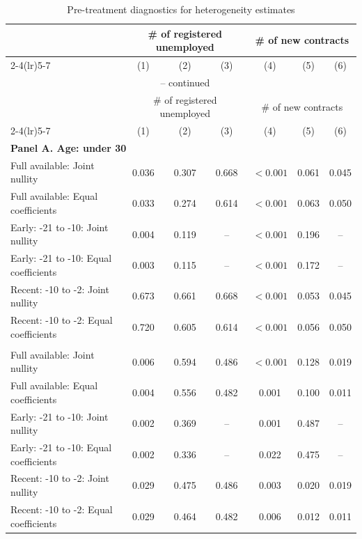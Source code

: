 \begingroup
\scriptsize
\renewcommand{\arraystretch}{0.88}
\setlength{\tabcolsep}{2.0pt}
\begin{longtable}{@{}lcccccc@{}}
\caption{Pre-treatment diagnostics for heterogeneity estimates}\label{tab:v1_heterogeneity_pretrends}\\
\toprule
& \multicolumn{3}{c}{\# of registered unemployed} & \multicolumn{3}{c}{\# of new contracts} \\
\cmidrule(lr){2-4}\cmidrule(lr){5-7}
& (1) & (2) & (3) & (4) & (5) & (6) \\
\midrule
\endfirsthead
\multicolumn{7}{c}{\tablename\ \thetable{} -- continued} \\
\toprule
& \multicolumn{3}{c}{\# of registered unemployed} & \multicolumn{3}{c}{\# of new contracts} \\
\cmidrule(lr){2-4}\cmidrule(lr){5-7}
& (1) & (2) & (3) & (4) & (5) & (6) \\
\midrule
\endhead
\multicolumn{7}{l}{\textbf{Panel A. Age: under 30}} \\
Full available: Joint nullity & 0.036 & 0.307 & 0.668 & $<0.001$ & 0.061 & 0.045 \\
Full available: Equal coefficients & 0.033 & 0.274 & 0.614 & $<0.001$ & 0.063 & 0.050 \\
Early: -21 to -10: Joint nullity & 0.004 & 0.119 & -- & $<0.001$ & 0.196 & -- \\
Early: -21 to -10: Equal coefficients & 0.003 & 0.115 & -- & $<0.001$ & 0.172 & -- \\
Recent: -10 to -2: Joint nullity & 0.673 & 0.661 & 0.668 & $<0.001$ & 0.053 & 0.045 \\
Recent: -10 to -2: Equal coefficients & 0.720 & 0.605 & 0.614 & $<0.001$ & 0.056 & 0.050 \\
\addlinespace[5pt]
\multicolumn{7}{l}{\textbf{Panel B. Age: 30--39}} \\
Full available: Joint nullity & 0.006 & 0.594 & 0.486 & $<0.001$ & 0.128 & 0.019 \\
Full available: Equal coefficients & 0.004 & 0.556 & 0.482 & 0.001 & 0.100 & 0.011 \\
Early: -21 to -10: Joint nullity & 0.002 & 0.369 & -- & 0.001 & 0.487 & -- \\
Early: -21 to -10: Equal coefficients & 0.002 & 0.336 & -- & 0.022 & 0.475 & -- \\
Recent: -10 to -2: Joint nullity & 0.029 & 0.475 & 0.486 & 0.003 & 0.020 & 0.019 \\
Recent: -10 to -2: Equal coefficients & 0.029 & 0.464 & 0.482 & 0.006 & 0.012 & 0.011 \\

\end{longtable}

